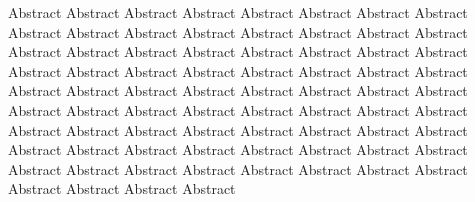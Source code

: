 Abstract Abstract Abstract Abstract Abstract Abstract Abstract Abstract Abstract Abstract Abstract Abstract Abstract Abstract Abstract Abstract Abstract Abstract Abstract 
Abstract Abstract Abstract Abstract Abstract Abstract Abstract Abstract Abstract Abstract Abstract Abstract Abstract Abstract Abstract Abstract Abstract Abstract Abstract 
Abstract Abstract Abstract Abstract Abstract Abstract Abstract Abstract Abstract Abstract Abstract Abstract Abstract Abstract Abstract Abstract Abstract Abstract Abstract 
Abstract Abstract Abstract Abstract Abstract Abstract Abstract Abstract Abstract Abstract Abstract Abstract Abstract Abstract Abstract Abstract Abstract Abstract Abstract 